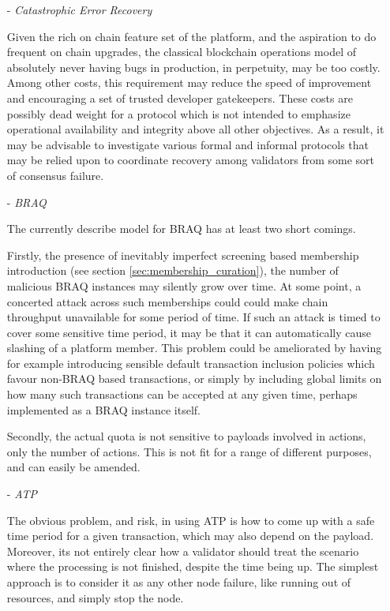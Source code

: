 \documentclass{article}
\begin{document}
\begin{itemize}

    \item[-] \textit{Catastrophic Error Recovery}

    Given the rich on chain feature set of the platform, and the aspiration to do frequent on chain upgrades, the classical blockchain operations model of absolutely never having bugs in production, in perpetuity, may be too costly. Among other costs, this requirement may reduce the speed of improvement and encouraging a set of trusted developer gatekeepers. These costs are possibly dead weight for a protocol which is not intended to emphasize operational availability and integrity above all other objectives. As a result, it may be advisable to investigate various formal and informal protocols that may be relied upon to coordinate recovery among validators from some sort of consensus failure.

    \item[-] \textit{BRAQ}

    The currently describe model for BRAQ has at least two short comings.

    Firstly, the presence of inevitably imperfect screening based membership introduction (see section \ref{sec:membership_curation}), the number of malicious BRAQ instances may silently grow over time. At some point, a concerted attack across such memberships could could make chain throughput unavailable for some period of time. If such an attack is timed to cover some sensitive time period, it may be that it can automatically cause slashing of a platform member. This problem could be ameliorated by having for example introducing sensible default transaction inclusion policies which favour non-BRAQ based transactions, or simply by including global limits on how many such transactions can be accepted at any given time, perhaps implemented as a BRAQ instance itself.

    Secondly, the actual quota is not sensitive to payloads involved in actions, only the number of actions. This is not fit for a range of different purposes, and can easily be amended.

    \item[-] \textit{ATP}

    The obvious problem, and risk, in using ATP is how to come up with a safe time period for a given transaction, which may also depend on the payload. Moreover, its not entirely clear how a validator should treat the scenario where the processing is not finished, despite the time being up. The simplest approach is to consider it as any other node failure, like running out of resources, and simply stop the node.


\end{itemize}
\end{document}
